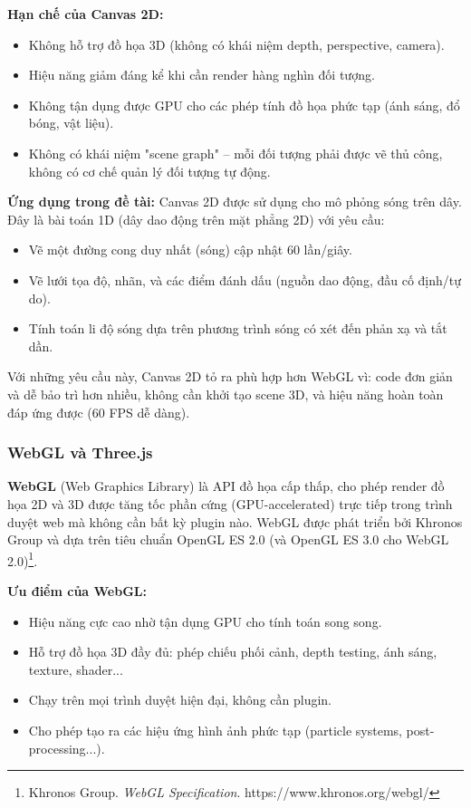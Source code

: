 \textbf{Hạn chế của Canvas 2D:}
\begin{itemize}
    \item Không hỗ trợ đồ họa 3D (không có khái niệm depth, perspective, camera).
    \item Hiệu năng giảm đáng kể khi cần render hàng nghìn đối tượng.
    \item Không tận dụng được GPU cho các phép tính đồ họa phức tạp (ánh sáng, đổ bóng, vật liệu).
    \item Không có khái niệm "scene graph" – mỗi đối tượng phải được vẽ thủ công, không có cơ chế quản lý đối tượng tự động.
\end{itemize}

\textbf{Ứng dụng trong đề tài:} Canvas 2D được sử dụng cho mô phỏng sóng trên dây. Đây là bài toán 1D (dây dao động trên mặt phẳng 2D) với yêu cầu:
\begin{itemize}
    \item Vẽ một đường cong duy nhất (sóng) cập nhật 60 lần/giây.
    \item Vẽ lưới tọa độ, nhãn, và các điểm đánh dấu (nguồn dao động, đầu cố định/tự do).
    \item Tính toán li độ sóng dựa trên phương trình sóng có xét đến phản xạ và tắt dần.
\end{itemize}
Với những yêu cầu này, Canvas 2D tỏ ra phù hợp hơn WebGL vì: code đơn giản và dễ bảo trì hơn nhiều, không cần khởi tạo scene 3D, và hiệu năng hoàn toàn đáp ứng được (60 FPS dễ dàng).

\subsubsection{WebGL và Three.js}

\textbf{WebGL} (Web Graphics Library) là API đồ họa cấp thấp, cho phép render đồ họa 2D và 3D được tăng tốc phần cứng (GPU-accelerated) trực tiếp trong trình duyệt web mà không cần bất kỳ plugin nào. WebGL được phát triển bởi Khronos Group và dựa trên tiêu chuẩn OpenGL ES 2.0 (và OpenGL ES 3.0 cho WebGL 2.0)\footnote{Khronos Group. \textit{WebGL Specification}. https://www.khronos.org/webgl/}.

\textbf{Ưu điểm của WebGL:}
\begin{itemize}
    \item Hiệu năng cực cao nhờ tận dụng GPU cho tính toán song song.
    \item Hỗ trợ đồ họa 3D đầy đủ: phép chiếu phối cảnh, depth testing, ánh sáng, texture, shader...
    \item Chạy trên mọi trình duyệt hiện đại, không cần plugin.
    \item Cho phép tạo ra các hiệu ứng hình ảnh phức tạp (particle systems, post-processing...).
\end{itemize}

